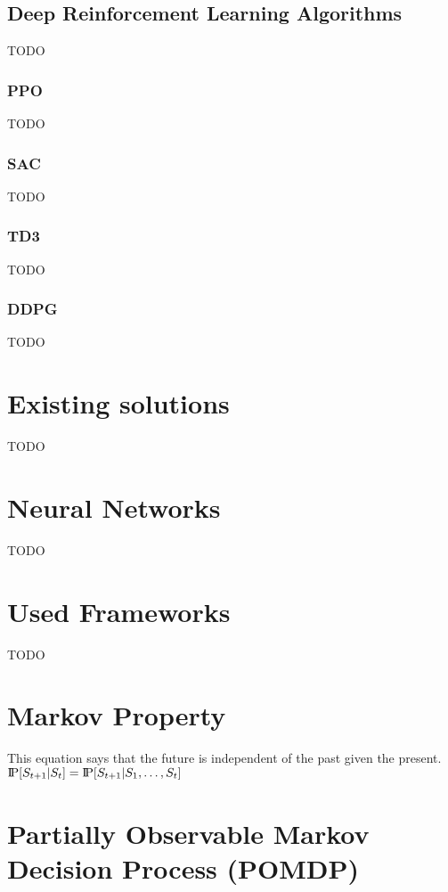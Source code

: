 \begin{itemize}
\subsection{Deep Reinforcement Learning Algorithms}\label{subsec:deep-reinforcement-learning-algorithms}
TODO

\subsubsection{PPO}
TODO

\subsubsection{SAC}
TODO

\subsubsection{TD3}
TODO

\subsubsection{DDPG}
TODO


\section{Existing solutions}\label{sec:existing-solutions}
TODO


\section{Neural Networks}\label{sec:neural-networks}
TODO


\section{Used Frameworks}\label{sec:used-frameworks}
TODO


\section{Markov Property}
This equation says that the future is independent of the past given the present.
$\text{I\kern-0.15em P}[S_{t+1}|S_t] = \text{I\kern-0.15em P}[S_{t+1}|S_1,\ldots,S_t]$


\section{Partially Observable Markov Decision Process (POMDP)}


\end{itemize}
